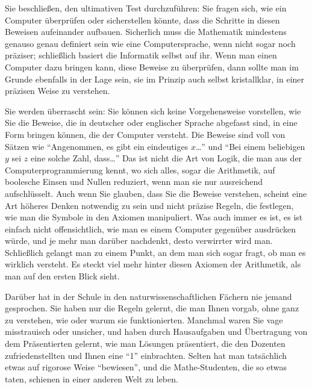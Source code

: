 Sie beschließen, den ultimativen Test durchzuführen: Sie fragen sich, wie ein Computer überprüfen oder sicherstellen könnte, dass die Schritte in diesen Beweisen aufeinander aufbauen.
Sicherlich muss die Mathematik mindestens genauso genau definiert sein wie eine Computersprache, wenn nicht sogar noch präziser; schließlich basiert die Informatik selbst auf ihr.
Wenn man einen Computer dazu bringen kann, diese Beweise zu überprüfen, dann sollte man im Grunde ebenfalls in der Lage sein, sie im Prinzip auch selbst kristallklar, in einer präzisen Weise zu verstehen.

Sie werden überrascht sein: Sie können sich keine Vorgehensweise vorstellen, wie Sie die Beweise, die in deutscher oder englischer Sprache abgefasst sind, in eine Form bringen können, die der Computer versteht.
Die Beweise sind voll von Sätzen wie "`Angenommen, es gibt ein eindeutiges $x$\ldots"' und "`Bei einem beliebigen $y$ sei $z$ eine solche Zahl, dass\ldots"' Das ist nicht die Art von Logik, die man aus der Computerprogrammierung kennt, wo sich alles, sogar die Arithmetik, auf boolesche Einsen und Nullen reduziert, wenn man sie nur ausreichend aufschlüsselt.  Auch wenn Sie glauben, dass Sie die Beweise verstehen, scheint eine Art höheres Denken notwendig zu sein und nicht präzise Regeln, die festlegen, wie man die Symbole in den Axiomen manipuliert.  Was auch immer es ist, es ist einfach nicht offensichtlich, wie man es einem Computer gegenüber ausdrücken würde, und je mehr man darüber nachdenkt, desto verwirrter wird man. Schließlich gelangt man zu einem Punkt, an dem man sich sogar fragt, ob man es wirklich versteht.  Es steckt viel mehr hinter diesen Axiomen der Arithmetik, als man auf den ersten Blick sieht.

Darüber hat in der Schule in den naturwissenschaftlichen Fächern nie jemand gesprochen.  Sie haben nur die Regeln gelernt, die man Ihnen vorgab, ohne ganz zu verstehen, wie oder warum sie funktionierten.  Manchmal waren Sie vage misstrauisch oder unsicher, und haben durch Hausaufgaben und Übertragung von dem Präsentierten gelernt, wie man Lösungen präsentiert, die den Dozenten zufriedenstellten und Ihnen eine "`1"' einbrachten.  Selten hat man tatsächlich etwas auf rigorose Weise "`bewiesen"', und die Mathe-Studenten, die so etwas taten, schienen in einer anderen Welt zu leben.

